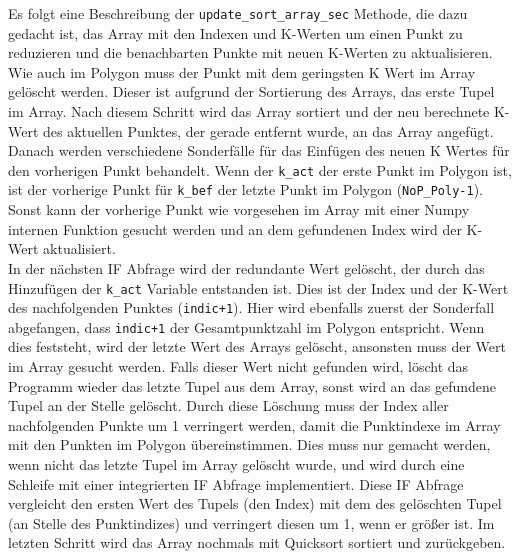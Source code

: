 {	Es folgt eine Beschreibung der \lstinline|update_sort_array_sec| Methode, die dazu gedacht ist, das Array mit den Indexen und K-Werten um einen Punkt zu reduzieren und die benachbarten Punkte mit neuen K-Werten zu aktualisieren. \\
	Wie auch im Polygon muss der Punkt mit dem geringsten K Wert im Array gelöscht werden. Dieser ist aufgrund der Sortierung des Arrays, das erste Tupel im Array. Nach diesem Schritt wird das Array sortiert und der neu berechnete K-Wert des aktuellen Punktes, der gerade entfernt wurde, an das Array angefügt. \\
	Danach werden verschiedene Sonderfälle für das Einfügen des neuen K Wertes für den vorherigen Punkt behandelt. Wenn der \lstinline|k_act| der erste Punkt im Polygon ist, ist der vorherige Punkt für \lstinline|k_bef| der letzte Punkt im Polygon (\lstinline|NoP_Poly-1|). Sonst kann der vorherige Punkt wie vorgesehen im Array mit einer Numpy internen Funktion gesucht werden und an dem gefundenen Index wird der K-Wert aktualisiert. \\
	In der nächsten IF Abfrage  wird der redundante Wert gelöscht, der durch das Hinzufügen der \lstinline|k_act| Variable entstanden ist. Dies ist der Index und der K-Wert des nachfolgenden Punktes (\lstinline|indic+1|). Hier wird ebenfalls zuerst der Sonderfall abgefangen, dass \lstinline|indic+1| der Gesamtpunktzahl im Polygon entspricht. Wenn dies feststeht, wird der letzte Wert des Arrays gelöscht, ansonsten muss der Wert im Array gesucht werden. Falls dieser Wert nicht gefunden wird, löscht das Programm wieder das letzte Tupel aus dem Array, sonst wird an das gefundene Tupel an der Stelle gelöscht. Durch diese Löschung muss der Index aller nachfolgenden Punkte um 1 verringert werden, damit die Punktindexe im Array mit den Punkten im Polygon übereinstimmen. Dies muss nur gemacht werden, wenn nicht das letzte Tupel im Array gelöscht wurde, und wird durch eine Schleife mit einer integrierten IF Abfrage implementiert. Diese IF Abfrage vergleicht den ersten Wert des Tupels (den Index) mit dem des gelöschten Tupel (an Stelle des Punktindizes) und verringert diesen um 1, wenn er größer ist.
	Im letzten Schritt wird das Array nochmals mit Quicksort sortiert und zurückgeben.

	

	

}
